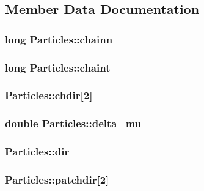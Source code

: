 \subsection{Member Data Documentation}
\hypertarget{struct_particles_a04953d98e6e851d694ec2d8c4b083f36}{
\subsubsection[{chainn}]{\setlength{\rightskip}{0pt plus 5cm}long Particles\+::chainn}}\label{struct_particles_a04953d98e6e851d694ec2d8c4b083f36}
\hypertarget{struct_particles_ada5f514a676d6204d53ea0f376eddbf8}{
\subsubsection[{chaint}]{\setlength{\rightskip}{0pt plus 5cm}long Particles\+::chaint}}\label{struct_particles_ada5f514a676d6204d53ea0f376eddbf8}
\hypertarget{struct_particles_a7662f9971f75e50391e3034bc122d1f9}{
\subsubsection[{chdir}]{ Particles\+::chdir\mbox{[}2\mbox{]}}}\label{struct_particles_a7662f9971f75e50391e3034bc122d1f9}
\hypertarget{struct_particles_a1dfd65b0f05feba78b5d983f08c2c277}{
\subsubsection[{delta\+\_\+mu}]{\setlength{\rightskip}{0pt plus 5cm}double Particles\+::delta\+\_\+mu}}\label{struct_particles_a1dfd65b0f05feba78b5d983f08c2c277}
\hypertarget{struct_particles_aafb56cf5a4a6e8c15540e691d8c384ec}{
\subsubsection[{dir}]{ Particles\+::dir}}\label{struct_particles_aafb56cf5a4a6e8c15540e691d8c384ec}
\hypertarget{struct_particles_a0905249fbc7f242cc1efdcaa6a8a2937}{
\subsubsection[{patchdir}]{ Particles\+::patchdir\mbox{[}2\mbox{]}}}\label{struct_particles_a0905249fbc7f242cc1efdcaa6a8a2937}
